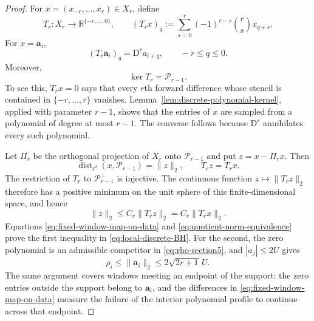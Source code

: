\documentclass[11pt]{amsart}
\theoremstyle{plain}
\theoremstyle{definition}
\theoremstyle{remark}
\numberwithin{equation}{section}
\theoremstyle{plain}
\begin{document}
\begin{proof}
	For $x=(x_{-r},\ldots,x_r)\in X_r$, define
	\begin{equation}\label{eq:fixed-window-difference-map}
		T_r:X_r\longrightarrow\mathbb R^{\{-r,\ldots,0\}},
		\qquad
		(T_rx)_q
		:=\sum_{s=0}^{r}(-1)^{r-s}\binom rs x_{q+s}.
	\end{equation}
	For $x=\mathbf a_i$,
	\begin{equation}\label{eq:fixed-window-map-on-data}
		(T_r\mathbf a_i)_q=\mathrm D^ra_{i+q},
		\qquad -r\le q\le0.
	\end{equation}
	Moreover,
	\begin{equation}\label{eq:fixed-window-map-kernel}
		\ker T_r=\mathcal P_{r-1}.
	\end{equation}
	To see this, $T_rx=0$ says that every $r$th forward difference whose
	stencil is contained in $\{-r,\ldots,r\}$ vanishes.
	Lemma~\ref{lem:discrete-polynomial-kernel}, applied with parameter $r-1$, shows
	that the entries of $x$ are sampled from a polynomial of degree at most
	$r-1$.  The converse follows because $\mathrm D^r$ annihilates every such
	polynomial.
	
	Let $\Pi_r$ be the orthogonal projection of $X_r$ onto
	$\mathcal P_{r-1}$ and put $z=x-\Pi_rx$.  Then
	\[
	\operatorname{dist}_{\ell^2}(x,\mathcal P_{r-1})=\|z\|_2,
	\qquad
	T_rz=T_rx.
	\]
	The restriction of $T_r$ to $\mathcal P_{r-1}^{\perp}$ is injective.  The
	continuous function $z\mapsto\|T_rz\|_2$ therefore has a positive minimum
	on the unit sphere of this finite-dimensional space, and hence
	\begin{equation}\label{eq:quotient-norm-equivalence}
		\|z\|_2\le C_r\|T_rz\|_2=C_r\|T_rx\|_2.
	\end{equation}
	Equations \eqref{eq:fixed-window-map-on-data} and
	\eqref{eq:quotient-norm-equivalence} prove the first inequality in
	\eqref{eq:local-discrete-BH}.  For the second, the zero polynomial is an
	admissible competitor in \eqref{eq:rho-section5}, and
	$|a_j|\le2U$ gives
	\[
	\rho_i\le\|\mathbf a_i\|_2
	\le2\sqrt{2r+1}\,U.
	\]
	The same argument covers windows meeting an endpoint of the support:
	the zero entries outside the support belong to $\mathbf a_i$, and the
	differences in \eqref{eq:fixed-window-map-on-data} measure the failure of the
	interior polynomial profile to continue across that endpoint.
\end{proof}
\end{document}
